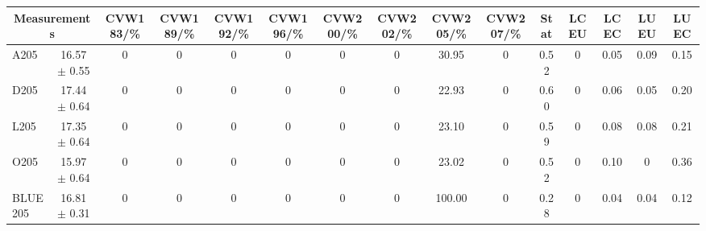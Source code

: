 \begin{table}[H]
\scriptsize
\begin{center}
\renewcommand{\arraystretch}{1.1}
\begin{tabular}{|lc|c|c|c|c|c|c|c|c|ccccc|}
\hline
\multicolumn{2}{|c|}{Measurements} & CVW{\tiny 183}/\%  & CVW{\tiny 189}/\%  & CVW{\tiny 192}/\%  & CVW{\tiny 196}/\%  & CVW{\tiny 200}/\%  & CVW{\tiny 202}/\%  & CVW{\tiny 205}/\%  & CVW{\tiny 207}/\%  & {\tiny Stat} & {\tiny LCEU} & {\tiny LCEC} & {\tiny LUEU} & {\tiny LUEC}\\
\hline
A205 &      16.57 $\pm$       0.55 &  0 &  0 &  0 &  0 &  0 &  0 &      30.95 &  0 &       0.52 &  0 &       0.05 &       0.09 &       0.15\\
D205 &      17.44 $\pm$       0.64 &  0 &  0 &  0 &  0 &  0 &  0 &      22.93 &  0 &       0.60 &  0 &       0.06 &       0.05 &       0.20\\
L205 &      17.35 $\pm$       0.64 &  0 &  0 &  0 &  0 &  0 &  0 &      23.10 &  0 &       0.59 &  0 &       0.08 &       0.08 &       0.21\\
O205 &      15.97 $\pm$       0.64 &  0 &  0 &  0 &  0 &  0 &  0 &      23.02 &  0 &       0.52 &  0 &       0.10 &  0 &       0.36\\
\hline
BLUE {\tiny 205} &      16.81 $\pm$       0.31 &  0 &  0 &  0 &  0 &  0 &  0 &     100.00 &  0 &       0.28 &  0 &       0.04 &       0.04 &       0.12\\
\hline
\end{tabular}
\renewcommand{\arraystretch}{1}
\end{center}
\end{table}
\vspace*{-0.5cm}
